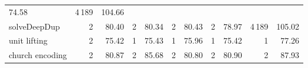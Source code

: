 \begin{tabular}{lrrrrrrrrrr}
 {\def\@currentlabel{74.58}\label{stats:slow:RateDup:SharedEvaled:time}74.58}&
 {\def\@currentlabel{4\,189}\label{stats:slow:RateDup:SharedFull:mem}4\,189} &
 {\def\@currentlabel{104.66}\label{stats:slow:RateDup:SharedFull:time}104.66} \\
\textsf{solveDeepDup}%
&
 {\def\@currentlabel{2}\label{stats:slow:SolveDeepDup:Unshared:mem}2} &
 {\def\@currentlabel{80.40}\label{stats:slow:SolveDeepDup:Unshared:time}80.40}&
 {\def\@currentlabel{2}\label{stats:slow:SolveDeepDup:Shared:mem}2} &
 {\def\@currentlabel{80.34}\label{stats:slow:SolveDeepDup:Shared:time}80.34}&
 {\def\@currentlabel{2}\label{stats:slow:SolveDeepDup:SharedThunk:mem}2} &
 {\def\@currentlabel{80.43}\label{stats:slow:SolveDeepDup:SharedThunk:time}80.43}&
 {\def\@currentlabel{2}\label{stats:slow:SolveDeepDup:SharedEvaled:mem}2} &
 {\def\@currentlabel{78.97}\label{stats:slow:SolveDeepDup:SharedEvaled:time}78.97}&
 {\def\@currentlabel{4\,189}\label{stats:slow:SolveDeepDup:SharedFull:mem}4\,189} &
 {\def\@currentlabel{105.02}\label{stats:slow:SolveDeepDup:SharedFull:time}105.02} \\
unit lifting%
&
 {\def\@currentlabel{2}\label{stats:slow:Unit:Unshared:mem}2} &
 {\def\@currentlabel{75.42}\label{stats:slow:Unit:Unshared:time}75.42}&
 {\def\@currentlabel{1}\label{stats:slow:Unit:Shared:mem}1} &
 {\def\@currentlabel{75.43}\label{stats:slow:Unit:Shared:time}75.43}&
 {\def\@currentlabel{1}\label{stats:slow:Unit:SharedThunk:mem}1} &
 {\def\@currentlabel{75.96}\label{stats:slow:Unit:SharedThunk:time}75.96}&
 {\def\@currentlabel{1}\label{stats:slow:Unit:SharedEvaled:mem}1} &
 {\def\@currentlabel{75.42}\label{stats:slow:Unit:SharedEvaled:time}75.42}&
 {\def\@currentlabel{1}\label{stats:slow:Unit:SharedFull:mem}1} &
 {\def\@currentlabel{77.26}\label{stats:slow:Unit:SharedFull:time}77.26} \\
church encoding%
&
 {\def\@currentlabel{2}\label{stats:slow:Church:Unshared:mem}2} &
 {\def\@currentlabel{80.87}\label{stats:slow:Church:Unshared:time}80.87}&
 {\def\@currentlabel{2}\label{stats:slow:Church:Shared:mem}2} &
 {\def\@currentlabel{85.68}\label{stats:slow:Church:Shared:time}85.68}&
 {\def\@currentlabel{2}\label{stats:slow:Church:SharedThunk:mem}2} &
 {\def\@currentlabel{80.80}\label{stats:slow:Church:SharedThunk:time}80.80}&
 {\def\@currentlabel{2}\label{stats:slow:Church:SharedEvaled:mem}2} &
 {\def\@currentlabel{80.90}\label{stats:slow:Church:SharedEvaled:time}80.90}&
 {\def\@currentlabel{2}\label{stats:slow:Church:SharedFull:mem}2} &
 {\def\@currentlabel{87.93}\label{stats:slow:Church:SharedFull:time}87.93} \\
\end{tabular}
\makeatother
